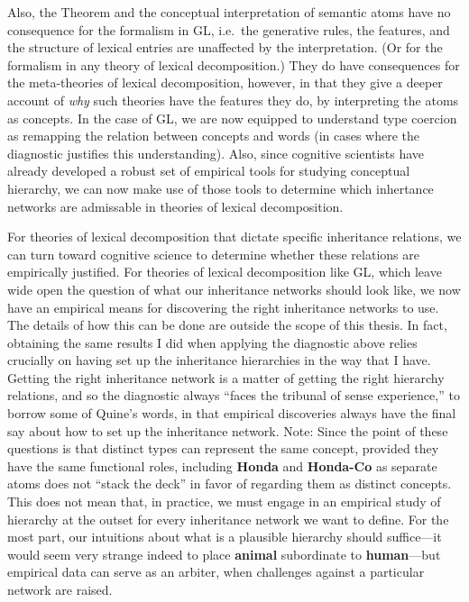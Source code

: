 Also, the Theorem and the conceptual interpretation of semantic atoms have no consequence for the formalism in GL, i.e.\ the generative rules, the features, and the structure of lexical entries are unaffected by the interpretation. (Or for the formalism in any theory of lexical decomposition.) They do have consequences for the meta-theories of lexical decomposition, however, in that they give a deeper account of \emph{why} such theories have the features they do, by interpreting the atoms as concepts. In the case of GL, we are now equipped to understand type coercion as remapping the relation between concepts and words (in cases where the diagnostic justifies  this understanding). Also, since cognitive scientists have already developed a robust set of empirical tools for studying conceptual hierarchy, we can now make use of those tools to determine which inhertance networks are admissable in theories of lexical decomposition.

For theories of lexical decomposition that dictate specific inheritance relations, we can turn toward cognitive science to determine whether these relations are empirically justified. For theories of lexical decomposition like GL, which leave wide open the question of what our inheritance networks should look like, we now have an empirical means for discovering the right inheritance networks to use. The details of how this can be done are outside the scope of this thesis. In fact, obtaining the same results I did when applying the diagnostic above relies crucially on having set up the inheritance hierarchies in the way that I have. Getting the right inheritance network is a matter of getting the right hierarchy relations, and so the diagnostic always ``faces the tribunal of sense experience,'' to borrow some of Quine's words, in that empirical discoveries always have the final say about how to set up the inheritance network. Note: Since the point of these questions is that distinct types can represent the same concept, provided they have the same functional roles, including {\bf Honda} and {\bf Honda-Co} as separate atoms does not ``stack the deck'' in favor of regarding them as distinct concepts. This does not mean that, in practice, we must engage in an empirical study of hierarchy at the outset for every inheritance network we want to define. For the most part, our intuitions about what is a plausible hierarchy should suffice---it would seem very strange indeed to place {\bf animal} subordinate to {\bf human}---but empirical data can serve as an arbiter, when challenges against a particular network are raised.

